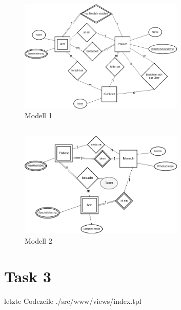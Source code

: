 \subsection{}
\begin{figure}[htbp] 
  \centering
     \includegraphics[width=0.7\textwidth]{erm_1.png}
  \caption{Modell 1}
\end{figure}

\subsection{}
\begin{figure}[htbp] 
  \centering
     \includegraphics[width=0.7\textwidth]{erm_2.png}
  \caption{Modell 2}
\end{figure}

\section{Task 3}
 letzte Codezeile
{./src/www/views/index.tpl}

\printbibliography %


